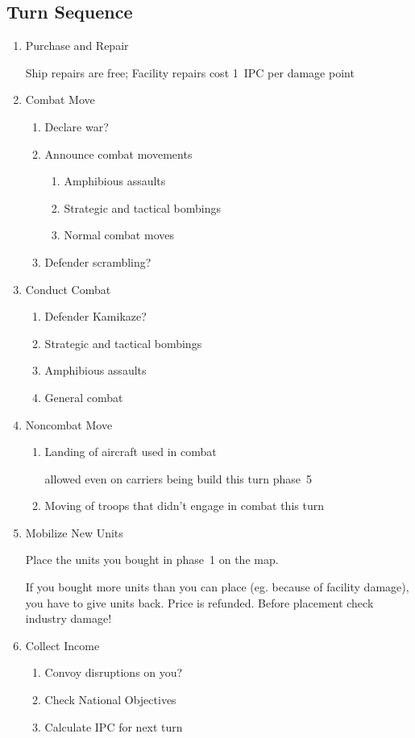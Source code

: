 \documentclass[10pt,twoside]{article}
\begin{document}
\begin{multicols*}{3}

\section*{Turn Sequence}
\begin{enumerate}
\item Purchase and Repair

Ship repairs are free; Facility repairs cost 1~IPC per damage point 
\item Combat Move
\begin{enumerate}
\item Declare war?
\item Announce combat movements
\begin{enumerate}
\item Amphibious assaults
\item Strategic and tactical bombings
\item Normal combat moves
\end{enumerate}
\item Defender scrambling?
\end{enumerate}
\item Conduct Combat
\begin{enumerate}
\item Defender Kamikaze?
\item Strategic and tactical bombings
\item Amphibious assaults
\item General combat
\end{enumerate}
\item Noncombat Move
\begin{enumerate}
\item Landing of aircraft used in combat

allowed even on carriers being build this turn phase~5

\item Moving of troops that didn't engage in combat this turn
\end{enumerate}

\item Mobilize New Units

Place the units you bought in phase~1 on the map.

If you bought more units than you can place (eg. because of facility damage), you have to give units back. Price is refunded. Before placement check industry damage!
\item Collect Income
\begin{enumerate}
\item Convoy disruptions on you?
\item Check National Objectives
\item Calculate IPC for next turn
\end{enumerate}
\end{enumerate}
\columnbreak


\end{multicols*}
\end{document}
